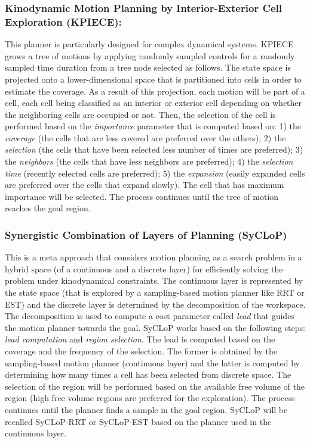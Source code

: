 \documentclass[runningheads,a4paper]{llncs}
\begin{document}
\subsubsection{Kinodynamic Motion Planning by Interior-Exterior Cell Exploration (KPIECE):}
This planner is particularly designed for  complex dynamical systems.
KPIECE grows a tree of motions by applying randomly sampled controls for a randomly sampled time duration from a tree node selected as follows.
The state space is projected onto a lower-dimensional space that is partitioned into cells in order to estimate the coverage.
As a result of this projection, each motion will be part of a cell, each cell being classified as an interior or exterior cell depending on whether the neighboring cells are occupied or not.
Then, the selection of the cell is performed based on the \textit{importance} parameter that is computed based on: 1) the \textit{coverage} (the cells that are less covered are preferred over
the others); 2) the \textit{selection} (the cells that have been selected less number of times are preferred); 3) the \textit{neighbors} (the cells that have less neighbors are preferred); 4) the \textit{selection time} (recently selected cells are preferred); 5) the \textit{expansion} (easily expanded cells are preferred over the cells that expand slowly).
The cell that has maximum importance will be selected.
The process continues until the tree of motion reaches the goal region.
\vspace{-4mm}
\subsubsection{Synergistic Combination of Layers of Planning (SyCLoP)}
This is a meta approach that considers motion planning as a search problem in a hybrid space (of a continuous and a discrete layer) for efficiently solving the problem
under kinodynamical constraints. The continuous layer is represented by the state space (that is explored by a sampling-based motion planner like RRT or EST) and the discrete layer is determined by the decomposition of the
workspace. The decomposition is used to compute a cost parameter called \textit{lead} that guides the motion planner towards the goal. SyCLoP works based on the following
steps: \textit{lead computation} and \textit{region selection}. The lead is computed based on the coverage and the frequency of the selection. The former is obtained by
the sampling-based motion planner (continuous layer) and the latter is computed by determining how many
times a cell has been selected from discrete space. The selection of the region will be performed based on the available free volume of the region (high free volume
regions are preferred for the exploration). The process continues until the planner finds a sample in the goal region.
SyCLoP will be recalled SyCLoP-RRT or SyCLoP-EST based on the planner used in the continuous layer.
\end{document}
